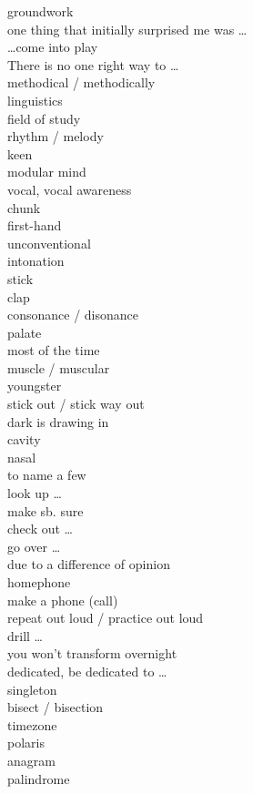 \documentclass[12pt]{article}
\begin{document}
groundwork \\
one thing that initially surprised me was \dots \\
\dots come into play \\
There is no one right way to \dots \\
methodical / methodically \\
linguistics \\
field of study \\
rhythm / melody \\
keen \\
modular mind \\
vocal, vocal awareness \\
chunk \\
first-hand \\
unconventional \\
intonation \\
stick \\
clap \\
consonance / disonance \\
palate \\
most of the time \\
muscle / muscular \\
youngster \\
stick out / stick way out \\
dark is drawing in \\
cavity \\
nasal \\
to name a few \\
look up \dots \\
make sb. sure \\
check out \dots \\
go over \dots \\
due to a difference of opinion \\
homephone \\
make a phone (call) \\
repeat out loud / practice out loud \\
drill \dots \\
you won't transform overnight \\
dedicated, be dedicated to \dots \\
singleton \\
bisect / bisection \\
timezone \\
polaris \\
anagram \\
palindrome \\
\end{document}
